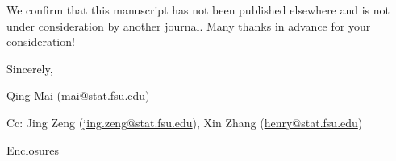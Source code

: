 \documentclass[12pt]{article}
\begin{document}
We confirm that this manuscript has not been published elsewhere and is not under consideration by another journal. Many thanks in advance for your consideration!

Sincerely,
\vspace{-3mm}

Qing Mai (\href{mailto:mai@stat.fsu.edu}{mai@stat.fsu.edu})
\vspace{-3mm}

Cc: Jing Zeng (\href{mailto:jing.zeng@stat.fsu.edu}{jing.zeng@stat.fsu.edu}), Xin Zhang (\href{mailto:henry@stat.fsu.edu}{henry@stat.fsu.edu})
\vspace{-3mm}

Enclosures
\end{document}
